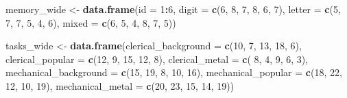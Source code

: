 \documentclass[]{article}
\newenvironment{Shaded}{\begin{snugshade}}{\end{snugshade}}
\newcommand{\KeywordTok}[1]{\textcolor[rgb]{0.13,0.29,0.53}{\textbf{#1}}}
\newcommand{\DataTypeTok}[1]{\textcolor[rgb]{0.13,0.29,0.53}{#1}}
\newcommand{\DecValTok}[1]{\textcolor[rgb]{0.00,0.00,0.81}{#1}}
\newcommand{\StringTok}[1]{\textcolor[rgb]{0.31,0.60,0.02}{#1}}
\newcommand{\OperatorTok}[1]{\textcolor[rgb]{0.81,0.36,0.00}{\textbf{#1}}}
\newcommand{\NormalTok}[1]{#1}
\begin{document}
\begin{Shaded}
\begin{Highlighting}[]
\NormalTok{memory_wide <-}\StringTok{ }\KeywordTok{data.frame}\NormalTok{(}\DataTypeTok{id =} \DecValTok{1}\OperatorTok{:}\DecValTok{6}\NormalTok{,}
                          \DataTypeTok{digit  =} \KeywordTok{c}\NormalTok{(}\DecValTok{6}\NormalTok{, }\DecValTok{8}\NormalTok{, }\DecValTok{7}\NormalTok{, }\DecValTok{8}\NormalTok{, }\DecValTok{6}\NormalTok{, }\DecValTok{7}\NormalTok{),}
                          \DataTypeTok{letter =} \KeywordTok{c}\NormalTok{(}\DecValTok{5}\NormalTok{, }\DecValTok{7}\NormalTok{, }\DecValTok{7}\NormalTok{, }\DecValTok{5}\NormalTok{, }\DecValTok{4}\NormalTok{, }\DecValTok{6}\NormalTok{),}
                          \DataTypeTok{mixed  =} \KeywordTok{c}\NormalTok{(}\DecValTok{6}\NormalTok{, }\DecValTok{5}\NormalTok{, }\DecValTok{4}\NormalTok{, }\DecValTok{8}\NormalTok{, }\DecValTok{7}\NormalTok{, }\DecValTok{5}\NormalTok{))}

\NormalTok{tasks_wide <-}\StringTok{ }\KeywordTok{data.frame}\NormalTok{(}\DataTypeTok{clerical_background   =} \KeywordTok{c}\NormalTok{(}\DecValTok{10}\NormalTok{,  }\DecValTok{7}\NormalTok{, }\DecValTok{13}\NormalTok{, }\DecValTok{18}\NormalTok{,  }\DecValTok{6}\NormalTok{),}
                         \DataTypeTok{clerical_popular      =} \KeywordTok{c}\NormalTok{(}\DecValTok{12}\NormalTok{,  }\DecValTok{9}\NormalTok{, }\DecValTok{15}\NormalTok{, }\DecValTok{12}\NormalTok{,  }\DecValTok{8}\NormalTok{),}
                         \DataTypeTok{clerical_metal        =} \KeywordTok{c}\NormalTok{( }\DecValTok{8}\NormalTok{,  }\DecValTok{4}\NormalTok{,  }\DecValTok{9}\NormalTok{,  }\DecValTok{6}\NormalTok{,  }\DecValTok{3}\NormalTok{),}
                         \DataTypeTok{mechanical_background =} \KeywordTok{c}\NormalTok{(}\DecValTok{15}\NormalTok{, }\DecValTok{19}\NormalTok{,  }\DecValTok{8}\NormalTok{, }\DecValTok{10}\NormalTok{, }\DecValTok{16}\NormalTok{),}
                         \DataTypeTok{mechanical_popular    =} \KeywordTok{c}\NormalTok{(}\DecValTok{18}\NormalTok{, }\DecValTok{22}\NormalTok{, }\DecValTok{12}\NormalTok{, }\DecValTok{10}\NormalTok{, }\DecValTok{19}\NormalTok{),}
                         \DataTypeTok{mechanical_metal      =} \KeywordTok{c}\NormalTok{(}\DecValTok{20}\NormalTok{, }\DecValTok{23}\NormalTok{, }\DecValTok{15}\NormalTok{, }\DecValTok{14}\NormalTok{, }\DecValTok{19}\NormalTok{))}


\end{Highlighting}
\end{Shaded}
\end{document}
